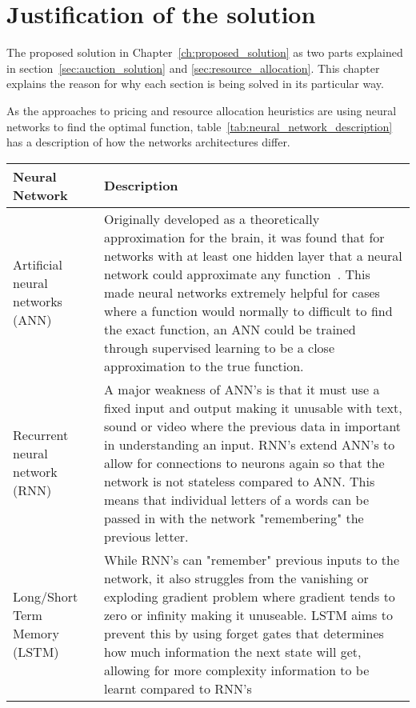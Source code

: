 \chapter{Justification of the solution}\label{ch:justification-of-the-solution}
The proposed solution in Chapter~\ref{ch:proposed_solution} as two parts explained in
section~\ref{sec:auction_solution} and \ref{sec:resource_allocation}. This chapter explains the reason for why each
section is being solved in its particular way.

As the approaches to pricing and resource allocation heuristics are using neural networks to find the optimal function,
table~\ref{tab:neural_network_description} has a description of how the networks architectures differ.

\begin{longtable}{|p{3.5cm}|p{11cm}|} \hline
    \textbf{Neural Network} & \textbf{Description} \\ \hline
    Artificial neural networks (ANN)~\cite{ANN} & Originally developed as a theoretically approximation for the brain,
        it was found that for networks with at least one hidden layer that a neural network could approximate any
        function~\citep{csaji2001approximation}. This made neural networks extremely helpful for cases where a function
        would normally to difficult to find the exact function, an ANN could be trained through supervised learning to
        be a close approximation to the true function. \\ \hline

    Recurrent neural network (RNN)~\cite{RNN} & A major weakness of ANN's is that it must use a fixed input and output
        making it unusable with text, sound or video where the previous data in important in understanding an input.
        RNN's extend ANN's to allow for connections to neurons again so that the network is not stateless compared to
        ANN. This means that individual letters of a words can be passed in with the network "remembering" the
        previous letter. \\ \hline

    Long/Short Term Memory (LSTM)~\cite{LSTM} & While RNN's can "remember" previous inputs to the network, it also
        struggles from the vanishing or exploding gradient problem where gradient tends to zero or infinity making it
        unuseable. LSTM aims to prevent this by using forget gates that determines how much information the next state
        will get, allowing for more complexity information to be learnt compared to RNN's\\ \hline


\end{longtable}
